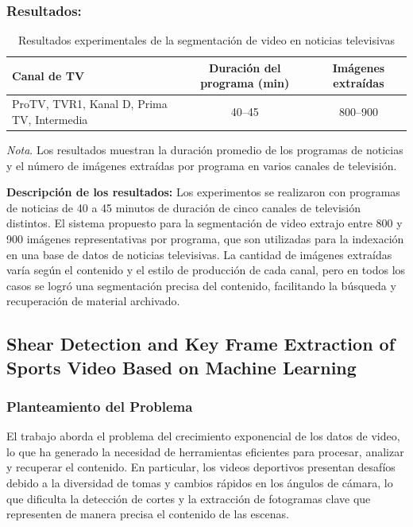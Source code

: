 	
\subsubsection{Resultados: }

\begin{table}[h]
    \centering
    \caption{Resultados experimentales de la segmentación de video en noticias televisivas}
    \begin{tabular}{lcc}
        \hline
        \textbf{Canal de TV} & \textbf{Duración del programa (min)} & \textbf{Imágenes extraídas} \\
        \hline
        ProTV, TVR1, Kanal D, Prima TV, Intermedia & 40--45 & 800--900 \\
        \hline
    \end{tabular}
    \label{tab:segmentacion}
    \begin{flushleft}
    \textit{Nota}. Los resultados muestran la duración promedio de los programas de noticias y el número de imágenes extraídas por programa en varios canales de televisión.
    \end{flushleft}
\end{table}


\noindent \textbf{Descripción de los resultados:} Los experimentos se realizaron con programas de noticias de 40 a 45 minutos de duración de cinco canales de televisión distintos. El sistema propuesto para la segmentación de video extrajo entre 800 y 900 imágenes representativas por programa, que son utilizadas para la indexación en una base de datos de noticias televisivas. La cantidad de imágenes extraídas varía según el contenido y el estilo de producción de cada canal, pero en todos los casos se logró una segmentación precisa del contenido, facilitando la búsqueda y recuperación de material archivado.


\subsection{Shear Detection and Key Frame Extraction of Sports Video Based on Machine Learning}
\cite{wang2023shear}
\subsubsection{Planteamiento del Problema}

El trabajo aborda el problema del crecimiento exponencial de los datos de video, lo que ha generado la necesidad de herramientas eficientes para procesar, analizar y recuperar el contenido. En particular, los videos deportivos presentan desafíos debido a la diversidad de tomas y cambios rápidos en los ángulos de cámara, lo que dificulta la detección de cortes y la extracción de fotogramas clave que representen de manera precisa el contenido de las escenas.

